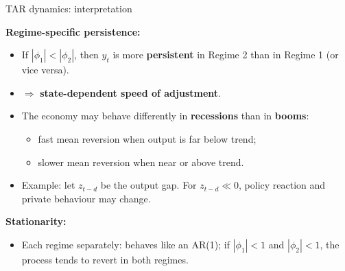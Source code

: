 \documentclass{beamer}
\begin{document}
\begin{frame}{TAR dynamics: interpretation}
\small

\textbf{Regime-specific persistence:}
\begin{itemize}
  \item If $|\phi_1| < |\phi_2|$, then $y_t$ is more \textbf{persistent} in Regime 2
        than in Regime 1 (or vice versa).
        \item $\Longrightarrow$ \textbf{state-dependent speed of adjustment}.
\end{itemize}

\begin{itemize}
  \item The economy may behave differently in \textbf{recessions} than in
        \textbf{booms}:
        \begin{itemize}
          \item fast mean reversion when output is far below trend;
          \item slower mean reversion when near or above trend.
        \end{itemize}
  \item Example: let $z_{t-d}$ be the output gap. For $z_{t-d} \ll 0$,
        policy reaction and private behaviour may change.
\end{itemize}

\textbf{Stationarity:}
\begin{itemize}
  \item Each regime separately: behaves like an AR(1); if $|\phi_1|<1$ and $|\phi_2|<1$,
        the process tends to revert in both regimes.

\end{itemize}



\end{frame}
\end{document}
